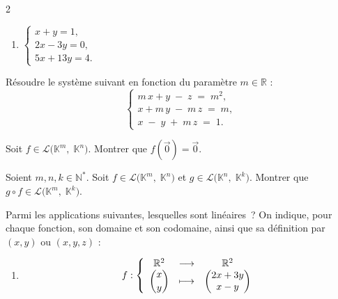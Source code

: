 \documentclass[a4paper,12pt]{article}
\begin{document}
\begin{multicols}{2}
\begin{exercice}[title=Exercice 2 $\star\star$ { [Calculer] }]{}{}
\begin{enumerate}
    \item $\displaystyle
      \begin{cases}
        x + y = 1,\\
        2x - 3y = 0,\\
        5x + 13y = 4.
      \end{cases}$
  \end{enumerate}
\end{exercice}

\begin{exercice}[title=Exercice 3 $\star\star$ { [Calculer] }]{}{}
  Résoudre le système suivant en fonction du paramètre $m \in \mathbb{R}$ :
  $$
  \begin{cases}
    m\,x + y \;-\; z \;=\; m^2,\\
    x + m\,y \;-\; m\,z \;=\; m,\\
    x \;-\; y \;+\; m\,z \;=\; 1.
  \end{cases}
  $$
\end{exercice}

\begin{exercice}[title=Exercice 4 $\star$ { [Chercher, Calculer] }]{}{}
  Soit $f \in \mathcal{L}\bigl(\mathbb{K}^m,\;\mathbb{K}^n\bigr)$. Montrer que $f(\vec{0}) = \vec{0}$.
\end{exercice}

\begin{exercice}[title=Exercice 5 $\star\star$ { [Raisonner, Communiquer] }]{}{}
  Soient $m,n,k \in \mathbb{N}^*$.
  Soit $f \in \mathcal{L}\bigl(\mathbb{K}^m,\;\mathbb{K}^n\bigr)$ et $g \in \mathcal{L}\bigl(\mathbb{K}^n,\;\mathbb{K}^k\bigr)$.
  Montrer que $g \circ f \in \mathcal{L}\bigl(\mathbb{K}^m,\;\mathbb{K}^k\bigr)$.
\end{exercice}

\begin{exercice}[title=Exercice 6 $\star$ { [Raisonner, Calculer] }]{}{}
  Parmi les applications suivantes, lesquelles sont linéaires ? On indique, pour chaque fonction, son domaine et son codomaine, ainsi que sa définition par $(x,y)$ ou $(x,y,z)$ :
  \begin{enumerate}
    \item
    \begin{equation*}
      f : \left \{
        \begin{array}{ccc}
          \mathbb{R}^2 &\longrightarrow &\mathbb{R}^2\\
          \dbinom{x}{y} &\longmapsto &
          \begin{pmatrix}
            2x + 3y \\
            x - y
          \end{pmatrix}
        \end{array} \right.
      \end{equation*}
      


\end{enumerate}
\end{exercice}
\end{multicols}
\end{document}
